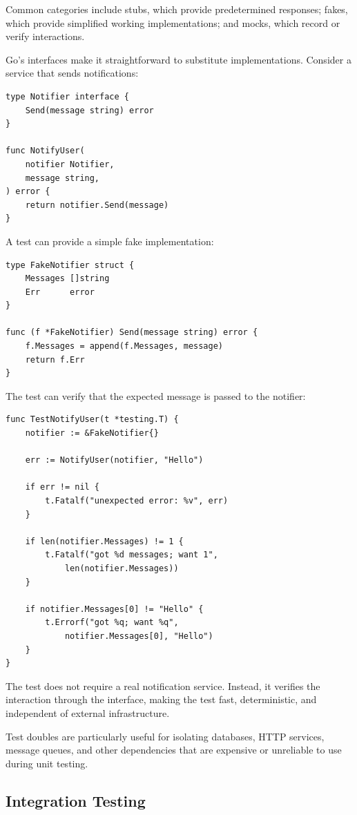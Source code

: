 Common categories include stubs, which provide predetermined responses; fakes, which provide simplified working implementations; and mocks, which record or verify interactions.

Go's interfaces make it straightforward to substitute implementations. Consider a service that sends notifications:

\begin{lstlisting}
type Notifier interface {
    Send(message string) error
}

func NotifyUser(
    notifier Notifier,
    message string,
) error {
    return notifier.Send(message)
}
\end{lstlisting}

A test can provide a simple fake implementation:

\begin{lstlisting}
type FakeNotifier struct {
    Messages []string
    Err      error
}

func (f *FakeNotifier) Send(message string) error {
    f.Messages = append(f.Messages, message)
    return f.Err
}
\end{lstlisting}

The test can verify that the expected message is passed to the notifier:

\begin{lstlisting}
func TestNotifyUser(t *testing.T) {
    notifier := &FakeNotifier{}

    err := NotifyUser(notifier, "Hello")

    if err != nil {
        t.Fatalf("unexpected error: %v", err)
    }

    if len(notifier.Messages) != 1 {
        t.Fatalf("got %d messages; want 1",
            len(notifier.Messages))
    }

    if notifier.Messages[0] != "Hello" {
        t.Errorf("got %q; want %q",
            notifier.Messages[0], "Hello")
    }
}
\end{lstlisting}

The test does not require a real notification service. Instead, it verifies the interaction through the interface, making the test fast, deterministic, and independent of external infrastructure.

Test doubles are particularly useful for isolating databases, HTTP services, message queues, and other dependencies that are expensive or unreliable to use during unit testing.

\subsection{Integration Testing}

